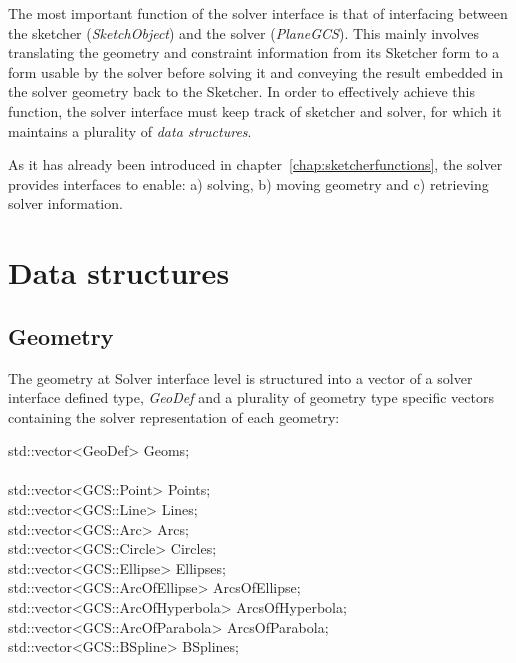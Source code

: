 \documentclass[12pt,twoside,a4paper]{book}
\newcommand{\SketchObject}{\emph{SketchObject}}
\begin{document}
    The most important function of the solver interface is that of interfacing between the sketcher (\SketchObject) and the solver (\emph{PlaneGCS}). This mainly involves translating the geometry and constraint information from its Sketcher form to a form usable by the solver before solving it and conveying the result embedded in the solver geometry back to the Sketcher. In order to effectively achieve this function, the solver interface must keep track of sketcher and solver, for which it maintains a plurality of \emph{data structures}.

    As it has already been introduced in chapter~\ref{chap:sketcherfunctions}, the solver provides interfaces to enable: a) solving, b) moving geometry and c) retrieving solver information.

    \section{Data structures}

    \subsection{Geometry}

    The geometry at Solver interface level is structured into a vector of a solver interface defined type, \emph{GeoDef} and a plurality of geometry type specific vectors containing the solver representation of each geometry:

    \begin{codequote}
    std::vector\textless{}GeoDef\textgreater{} Geoms;\\
    \\
    std::vector\textless{}GCS::Point\textgreater{}  Points;\\
    std::vector\textless{}GCS::Line\textgreater{}   Lines;\\
    std::vector\textless{}GCS::Arc\textgreater{}    Arcs;\\
    std::vector\textless{}GCS::Circle\textgreater{} Circles;\\
    std::vector\textless{}GCS::Ellipse\textgreater{} Ellipses;\\
    std::vector\textless{}GCS::ArcOfEllipse\textgreater{} ArcsOfEllipse;\\
    std::vector\textless{}GCS::ArcOfHyperbola\textgreater{} ArcsOfHyperbola;\\
    std::vector\textless{}GCS::ArcOfParabola\textgreater{} ArcsOfParabola;\\
    std::vector\textless{}GCS::BSpline\textgreater{} BSplines;
    \end{codequote}
\end{document}
